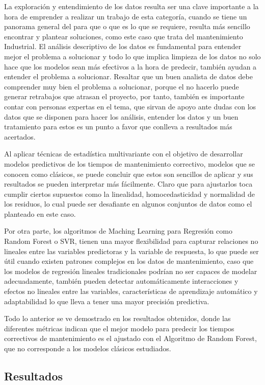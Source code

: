\documentclass[
  11pt,
  bookmarksnumbered]{article}
\begin{document}
La exploración y entendimiento de los datos resulta ser una clave importante a la hora de emprender a realizar un trabajo de esta categoría, cuando se tiene un panorama general del para que o que es lo que se requiere, resulta más sencillo encontrar y plantear soluciones, como este caso que trata del mantenimiento Industrial. El análisis descriptivo de los datos es fundamental para entender mejor el problema a solucionar y todo lo que implica limpieza de los datos no solo hace que los modelos sean más efectivos a la hora de predecir, también ayudan a entender el problema a solucionar.
Resaltar que un buen analista de datos debe comprender muy bien el problema a solucionar, porque el no hacerlo puede generar retrabajos que atrasan el proyecto, por tanto, también es importante contar con personas expertas en el tema, que sirvan de apoyo ante dudas con los datos que se disponen para hacer los análisis, entender los datos y un buen tratamiento para estos es un punto a favor que conlleva a resultados más acertados.

Al aplicar técnicas de estadística multivariante con el objetivo de desarrollar modelos predictivos de los tiempos de mantenimiento correctivo, modelos que se conocen como clásicos, se puede concluir que estos son sencillos de aplicar y sus resultados se pueden interpretar más fácilmente. Claro que para ajustarlos toca cumplir ciertos supuestos como la linealidad, homocedasticidad y normalidad de los residuos, lo cual puede ser desafiante en algunos conjuntos de datos como el planteado en este caso.

Por otra parte, los algoritmos de Maching Learning para Regresión como Random Forest o SVR, tienen una mayor flexibilidad para capturar relaciones no lineales entre las variables predictoras y la variable de respuesta, lo que puede ser útil cuando existen patrones complejos en los datos de mantenimiento, caso que los modelos de regresión lineales tradicionales podrían no ser capaces de modelar adecuadamente, también pueden detectar automáticamente interacciones y efectos no lineales entre las variables, características de aprendizaje automático y adaptabilidad lo que lleva a tener una mayor precisión predictiva.

Todo lo anterior se ve demostrado en los resultados obtenidos, donde las diferentes métricas indican que el mejor modelo para predecir los tiempos correctivos de mantenimiento es el ajustado con el Algoritmo de Random Forest, que no corresponde a los modelos clásicos estudiados.

\hypertarget{resultados}{%
\subsection{Resultados}\label{resultados}}
\end{document}
